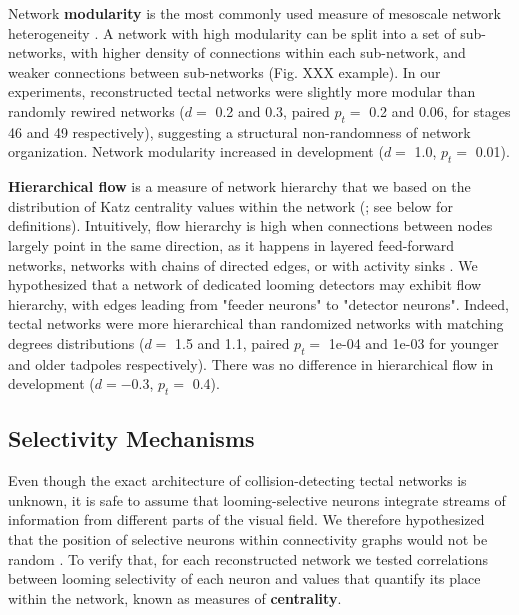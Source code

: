 \documentclass{article}
\begin{document}
Network \textbf{modularity} is the most commonly used measure of mesoscale network heterogeneity \citep{leicht2008community,newman2006modularity}. A network with high modularity can be split into a set of sub-networks, with higher density of connections within each sub-network, and weaker connections between sub-networks (Fig. XXX example). In our experiments, reconstructed tectal networks were slightly more modular than randomly rewired networks ($d=$ 0.2 and 0.3, paired $p_t=$ 0.2 and 0.06, for stages 46 and 49 respectively), suggesting a structural non-randomness of network organization. Network modularity increased in development ($d=$ 1.0, $p_t =$ 0.01).

\textbf{Hierarchical flow} is a measure of network hierarchy \citep{mones2012hierarchy} that we based on the distribution of Katz centrality values within the network (\citealt{katz1953original,fletcher2018katz}; see below for definitions). Intuitively, flow hierarchy is high when connections between nodes largely point in the same direction, as it happens in layered feed-forward networks, networks with chains of directed edges, or with activity sinks \citep{czegel2015hierarchy}. We hypothesized that a network of dedicated looming detectors may exhibit flow hierarchy, with edges leading from "feeder neurons" to "detector neurons". Indeed, tectal networks were more hierarchical than randomized networks with matching degrees distributions ($d=$ 1.5 and 1.1, paired $p_t=$ 1e-04 and 1e-03 for younger and older tadpoles respectively). There was no difference in hierarchical flow in development ($d=-$0.3, $p_t=$ 0.4).

\subsection*{Selectivity Mechanisms}

Even though the exact architecture of collision-detecting tectal networks is unknown, it is safe to assume that looming-selective neurons integrate streams of information from different parts of the visual field. We therefore hypothesized that the position of selective neurons within connectivity graphs would not be random \citep{timme2016degree}. To verify that, for each reconstructed network we tested correlations between looming selectivity of each neuron and values that quantify its place within the network, known as measures of \textbf{centrality}.
\end{document}

